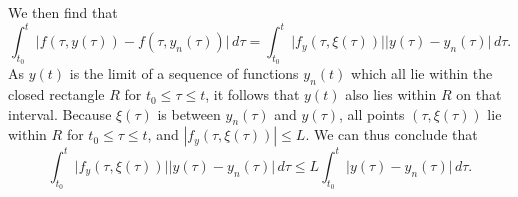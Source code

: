 \documentclass{myart}
\begin{document}
We then find that
\begin{equation*}
\int_{t_0}^t \Big|f(\tau, y(\tau)) - f(\tau, y_n(\tau))\Big| \,d\tau = \int_{t_0}^t \Big|f_y(\tau, \xi(\tau))\Big| \Big|y(\tau) - y_n(\tau)\Big| \,d\tau.
\end{equation*}
As $y(t)$ is the limit of a sequence of functions $y_n(t)$ which all lie within the closed rectangle $R$ for $t_0 \leq \tau \leq t$, it follows that $y(t)$ also lies within $R$ on that interval. Because $\xi(\tau)$ is between $y_n(\tau)$ and $y(\tau)$, all points $(\tau, \xi(\tau))$ lie within $R$ for $t_0 \leq \tau \leq t$, and $|f_y(\tau, \xi(\tau))| \leq L$. We can thus conclude that
\begin{equation*}
\int_{t_0}^t \Big|f_y(\tau, \xi(\tau))\Big| \Big|y(\tau) - y_n(\tau)\Big| \,d\tau \leq L \int_{t_0}^t \Big|y(\tau) - y_n(\tau)\Big| \,d\tau.
\end{equation*}
\end{document}
